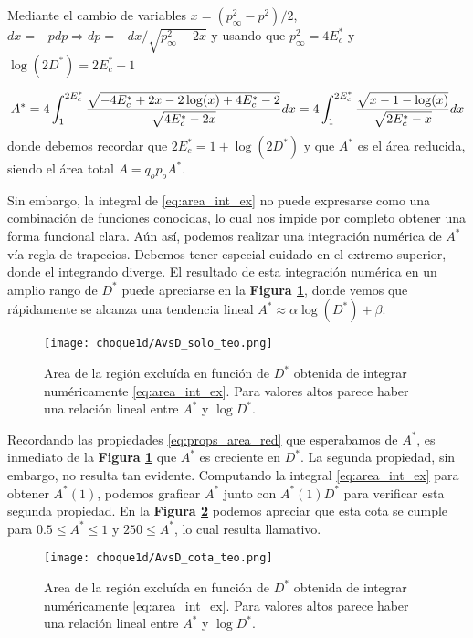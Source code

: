 Mediante el cambio de variables $x = (p_\infty^2-p^2)/2$, $dx = -p dp \Rightarrow dp = -dx/\sqrt{p_\infty^2-2x}$ y usando que $p_\infty^2 = 4E^*_c$ y $\log(2D^*) = 2E_c^* - 1$

\begin{equation}{\label{eq:area_int_ex}}
A^* = 4\int_{1}^{2E_c^*} \frac{\sqrt{-4E_c^* + 2x - 2\log(x) + 4E_c^* - 2}}{\sqrt{4E_c^* - 2x}} dx
= 4\int_{1}^{2E_c^*} \frac{\sqrt{x -1 - \log(x)}}{\sqrt{2E_c^* - x}} dx
\end{equation}
donde debemos recordar que $2E_c^* = 1 + \log(2D^*) $ y que $A^*$ es el área reducida, siendo el área total $A = q_op_oA^*$.

Sin embargo, la integral de \eqref{eq:area_int_ex} no puede expresarse como una combinación de funciones conocidas, lo cual nos impide por completo obtener una forma funcional clara.
Aún así, podemos realizar una integración numérica de $A^*$ vía regla de trapecios.
Debemos tener especial cuidado en el extremo superior, donde el integrando diverge.
El resultado de esta integración numérica en un amplio rango de $D^*$ puede apreciarse en la \textbf{Figura \ref{fig:AvsD_teo}}, donde vemos que rápidamente se alcanza una tendencia lineal $A^* \approx \alpha \log(D^*) + \beta$.

\begin{figure}
	\centering
	\texttt{[image: choque1d/AvsD\_solo\_teo.png]}
	\caption{Area de la región excluída en función de $D^*$ obtenida de integrar numéricamente \eqref{eq:area_int_ex}. Para valores altos parece haber una relación lineal entre $A^*$ y $\log D^*$.}
	\label{fig:AvsD_teo}
\end{figure}

Recordando las propiedades \eqref{eq:props_area_red} que esperabamos de $A^*$, es inmediato de la \textbf{Figura \ref{fig:AvsD_teo}} que $A^*$ es creciente en $D^*$.
La segunda propiedad, sin embargo, no resulta tan evidente. 
Computando la integral \eqref{eq:area_int_ex} para obtener $A^*(1)$, podemos graficar $A^*$ junto con $A^*(1)D^*$ para verificar esta segunda propiedad.
En la \textbf{Figura \ref{fig:AvsD_teo_cota}} podemos apreciar que esta cota se cumple para  $0.5\leq A^*\leq 1$ y $250\leq A^*$, lo cual resulta llamativo.

\begin{figure}
	\centering
	\texttt{[image: choque1d/AvsD\_cota\_teo.png]}
	\caption{Area de la región excluída en función de $D^*$ obtenida de integrar numéricamente \eqref{eq:area_int_ex}. Para valores altos parece haber una relación lineal entre $A^*$ y $\log D^*$.}
	\label{fig:AvsD_teo_cota}
\end{figure}

